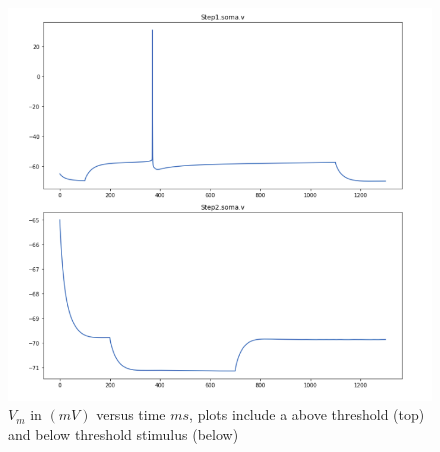 \begin{figure}%
  \begin{center}
    \includegraphics[scale=0.8]{figures/L5Somatosensory_not_optimized.png}
    \caption[Plot of at threshold firing pyramidal neuron]{$V_{m}$ in $(mV)$ versus time $ms$, plots include a above threshold (top) and below threshold stimulus (below)}
  \label{fig:brief_shape}
  \end{center}
\end{figure}

